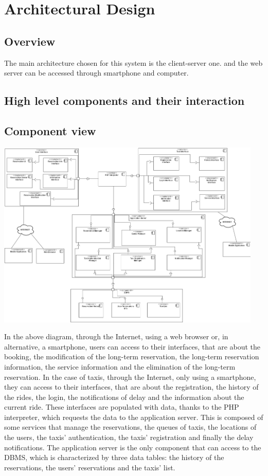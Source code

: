 \section{Architectural Design}
\subsection{Overview}
The main architecture chosen for this system is the client-server one. and the web server can be accessed through smartphone and computer.

\subsection{High level components and their interaction}
\subsection{Component view}
	\begin{center}
		\includegraphics[width=0.95\textwidth]{./images/component_view.png}
	\end{center}
	
	In the above diagram, through the Internet, using a web browser or, in alternative, a smartphone, users can access to their interfaces, that are about the booking, the modification of the long-term reservation, the long-term reservation information, the service information and the elimination of the long-term reservation. 
	In the case of taxis, through the Internet, only using a smartphone, they can access to their interfaces, that are about the registration, the history of the rides, the login, the notifications of delay and the information about the current ride.
	These interfaces are populated with data, thanks to the PHP interpreter, which requests the data to the application server. This is composed of some services that manage the reservations, the queues of taxis, the locations of the users, the taxis' authentication, the taxis' registration and finally the delay notifications.
	The application server is the only component that can access to the DBMS, which is characterized by three data tables: the history of the reservations, the users' reservations and the taxis' list.
